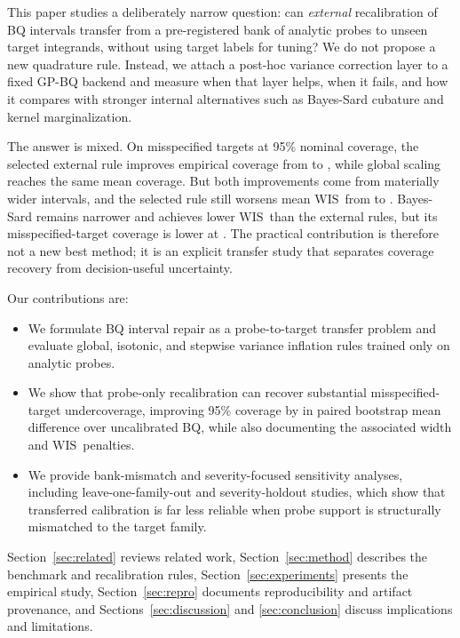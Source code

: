 \documentclass{article}
\newcommand{\wis}{\ensuremath{\mathrm{WIS}}}
\begin{document}
This paper studies a deliberately narrow question: can \emph{external} recalibration of BQ intervals transfer from a pre-registered bank of analytic probes to unseen target integrands, without using target labels for tuning? We do not propose a new quadrature rule. Instead, we attach a post-hoc variance correction layer to a fixed GP-BQ backend and measure when that layer helps, when it fails, and how it compares with stronger internal alternatives such as Bayes-Sard cubature and kernel marginalization.

The answer is mixed. On misspecified targets at 95\% nominal coverage, the selected external rule improves empirical coverage from \MissUncalCoverage{} to \MissSelectedCoverage{}, while global scaling reaches the same mean coverage. But both improvements come from materially wider intervals, and the selected rule still worsens mean \wis\ from \MissUncalWIS{} to \MissSelectedWIS{}. Bayes-Sard remains narrower and achieves lower \wis\ than the external rules, but its misspecified-target coverage is lower at \MissBayesCoverage{}. The practical contribution is therefore not a new best method; it is an explicit transfer study that separates coverage recovery from decision-useful uncertainty.

Our contributions are:
\begin{itemize}
  \item We formulate BQ interval repair as a probe-to-target transfer problem and evaluate global, isotonic, and stepwise variance inflation rules trained only on analytic probes.
  \item We show that probe-only recalibration can recover substantial misspecified-target undercoverage, improving 95\% coverage by \SelectedVsUncalCoverageDiffMean{} in paired bootstrap mean difference over uncalibrated BQ, while also documenting the associated width and \wis\ penalties.
  \item We provide bank-mismatch and severity-focused sensitivity analyses, including leave-one-family-out and severity-holdout studies, which show that transferred calibration is far less reliable when probe support is structurally mismatched to the target family.
\end{itemize}

Section~\ref{sec:related} reviews related work, Section~\ref{sec:method} describes the benchmark and recalibration rules, Section~\ref{sec:experiments} presents the empirical study, Section~\ref{sec:repro} documents reproducibility and artifact provenance, and Sections~\ref{sec:discussion} and \ref{sec:conclusion} discuss implications and limitations.
\end{document}
